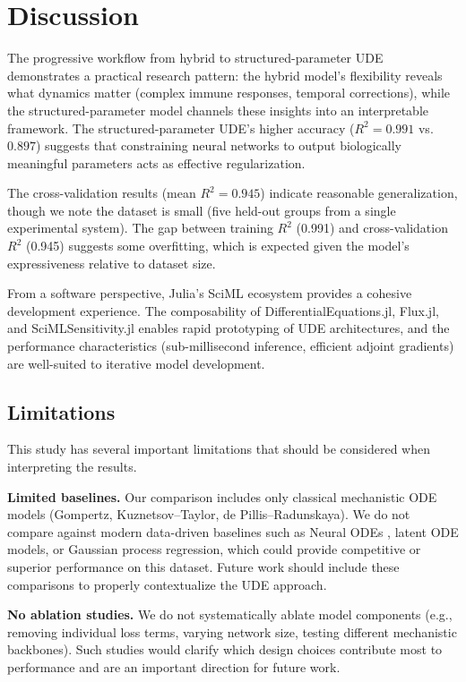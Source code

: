 \documentclass{juliacon}
\begin{document}
\section{Discussion}

The progressive workflow from hybrid to structured-parameter UDE demonstrates a practical research pattern: the hybrid model's flexibility reveals what dynamics matter (complex immune responses, temporal corrections), while the structured-parameter model channels these insights into an interpretable framework. The structured-parameter UDE's higher accuracy ($R^2 = 0.991$ vs.\ $0.897$) suggests that constraining neural networks to output biologically meaningful parameters acts as effective regularization.

The cross-validation results (mean $R^2 = 0.945$) indicate reasonable generalization, though we note the dataset is small (five held-out groups from a single experimental system). The gap between training $R^2$ (0.991) and cross-validation $R^2$ (0.945) suggests some overfitting, which is expected given the model's expressiveness relative to dataset size.

From a software perspective, Julia's SciML ecosystem provides a cohesive development experience. The composability of DifferentialEquations.jl, Flux.jl, and SciMLSensitivity.jl enables rapid prototyping of UDE architectures, and the performance characteristics (sub-millisecond inference, efficient adjoint gradients) are well-suited to iterative model development.

\subsection{Limitations}
\label{sec:limitations}

This study has several important limitations that should be considered when interpreting the results.

\textbf{Limited baselines.} Our comparison includes only classical mechanistic ODE models (Gompertz, Kuznetsov--Taylor, de Pillis--Radunskaya). We do not compare against modern data-driven baselines such as Neural ODEs \cite{chen2018node}, latent ODE models, or Gaussian process regression, which could provide competitive or superior performance on this dataset. Future work should include these comparisons to properly contextualize the UDE approach.

\textbf{No ablation studies.} We do not systematically ablate model components (e.g., removing individual loss terms, varying network size, testing different mechanistic backbones). Such studies would clarify which design choices contribute most to performance and are an important direction for future work.
\end{document}
